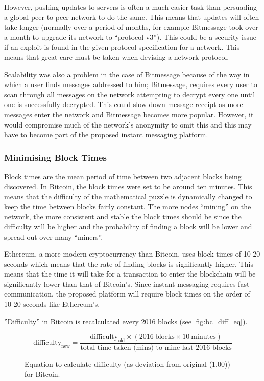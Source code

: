 \documentclass{article}
\begin{document}
However, pushing updates to servers is often a much easier task than persuading a global peer-to-peer network to do the same. This means that updates will often take longer (normally over a period of months, for example Bitmessage took over a month to upgrade its network to ``protocol v3''\cite{bitmessage_protocol_v3}). This could be a security issue if an exploit is found in the given protocol specification for a network. This means that great care must be taken when devising a network protocol.

Scalability was also a problem in the case of Bitmessage because of the way in which a user finds messages addressed to him; Bitmessage, requires every user to scan through all messages on the network attempting to decrypt every one until one is successfully decrypted. This could slow down message receipt as more messages enter the network and Bitmessage becomes more popular. However, it would compromise much of the network's anonymity to omit this and this may have to become part of the proposed instant messaging platform.

\subsubsection{Minimising Block Times}
Block times are the mean period of time between two adjacent blocks being discovered. In Bitcoin, the block times were set to be around ten minutes. This means that the difficulty of the mathematical puzzle is dynamically changed to keep the time between blocks fairly constant. The more nodes ``mining'' on the network, the more consistent and stable the block times should be since the difficulty will be higher and the probability of finding a block will be lower and spread out over many ``miners''.

Ethereum\cite{ethereum_intro_paper}, a more modern cryptocurrency than Bitcoin, uses block times of 10-20 seconds which means that the rate of finding blocks is significantly higher. This means that the time it will take for a transaction to enter the blockchain will be significantly lower than that of Bitcoin's. Since instant messaging requires fast communication, the proposed platform will require block times on the order of 10-20 seconds like Ethereum's.

''Difficulty'' in Bitcoin is recalculated every 2016 blocks (see \autoref{fig:bc_diff_eq}).
\begin{figure}[h]
    \[\textrm{difficulty}_{\textrm{new}} = \frac{\textrm{difficulty}_{\textrm{old}} \times (2016\ \textrm{blocks} \times 10\ \textrm{minutes})}{\textrm{total time taken (mins) to mine last 2016 blocks}}\]
    \caption{Equation to calculate difficulty (as deviation from original (1.00)) for Bitcoin.\cite{medium_bt_mystery}}
    \label{fig:bc_diff_eq}
\end{figure}
\end{document}
